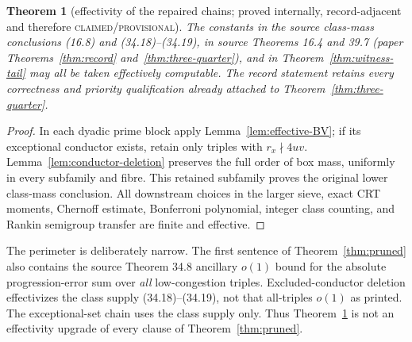 \documentclass[10pt,reqno]{amsart}
\newtheorem{theorem}{Theorem}[section]
\theoremstyle{definition}
\newcommand{\1}{\mathbf 1}
\begin{document}
\begin{theorem}[effectivity of the repaired chains; proved internally,
record-adjacent and therefore \textsc{claimed/provisional}]
\label{thm:effectivity}
The constants in the source class-mass conclusions (16.8) and
(34.18)--(34.19), in source Theorems 16.4 and 39.7
(paper Theorems~\ref{thm:record} and~\ref{thm:three-quarter}), and in
Theorem~\ref{thm:witness-tail} may all be taken effectively computable.
The record statement retains every correctness and priority qualification
already attached to Theorem~\ref{thm:three-quarter}.
\end{theorem}
\begin{proof}
In each dyadic prime block apply Lemma~\ref{lem:effective-BV}; if its
exceptional conductor exists, retain only triples with $r_x\nmid4uv$.
Lemma~\ref{lem:conductor-deletion} preserves the full order of box mass,
uniformly in every subfamily and fibre.  This retained subfamily proves the
original lower class-mass conclusion.  All downstream choices in the
larger sieve, exact CRT moments, Chernoff estimate, Bonferroni polynomial,
integer class counting, and Rankin semigroup transfer are finite and
effective.
\end{proof}
The perimeter is deliberately narrow.  The first sentence of
Theorem~\ref{thm:pruned} also contains the source Theorem 34.8 ancillary
$o(1)$ bound for the absolute progression-error sum over \emph{all}
low-congestion triples.  Excluded-conductor deletion effectivizes the class
supply (34.18)--(34.19), not that all-triples $o(1)$ as printed.  The
exceptional-set chain uses the class supply only.  Thus
Theorem~\ref{thm:effectivity} is not an effectivity upgrade of every clause
of Theorem~\ref{thm:pruned}.
\end{document}
